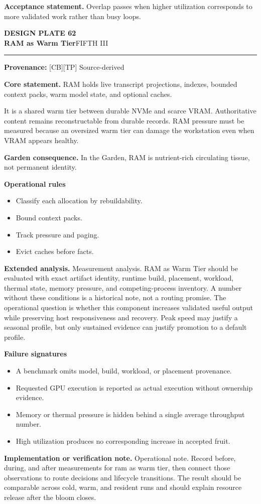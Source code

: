 \documentclass[10pt,letterpaper,oneside]{article}
\newcommand{\prov}[1]{\textcolor{gardenBlue}{\sffamily\footnotesize\textbf{Provenance:} #1}}
\newcommand{\platetitle}[3]{%
  \begin{minipage}[t][0.54in][t]{\textwidth}
  {\sffamily\bfseries\color{gardenDeep}\fontsize{9}{10}\selectfont DESIGN PLATE #1}\\[-1pt]
  {\sffamily\bfseries\color{gardenInk}\fontsize{16.5}{18}\selectfont #2}\hfill{\sffamily\color{gardenGreen}\large #3}
  \end{minipage}\vspace{-2pt}\hrule\vspace{5pt}}
\begin{document}
\begin{acceptbox}
\textbf{Acceptance statement.} Overlap passes when higher utilization corresponds to more validated work rather than busy loops.
\end{acceptbox}
\newpage
\platetitle{62}{RAM as Warm Tier}{FIFTH III}
\prov{[CB][TP] Source-derived}
\fontsize{8.85}{10.45}\selectfont
\begin{corebox}
\textbf{Core statement.} RAM holds live transcript projections, indexes, bounded context packs, warm model state, and optional caches.
\end{corebox}
It is a shared warm tier between durable NVMe and scarce VRAM. Authoritative content remains reconstructable from durable records. RAM pressure must be measured because an oversized warm tier can damage the workstation even when VRAM appears healthy.

\textbf{Garden consequence.} In the Garden, RAM is nutrient-rich circulating tissue, not permanent identity.

\textbf{Operational rules}
\begin{itemize}
\item Classify each allocation by rebuildability.
\item Bound context packs.
\item Track pressure and paging.
\item Evict caches before facts.
\end{itemize}
\textbf{Extended analysis.} Measurement analysis. RAM as Warm Tier should be evaluated with exact artifact identity, runtime build, placement, workload, thermal state, memory pressure, and competing-process inventory. A number without these conditions is a historical note, not a routing promise. The operational question is whether this component increases validated useful output while preserving host responsiveness and recovery. Peak speed may justify a seasonal profile, but only sustained evidence can justify promotion to a default profile.

\textbf{Failure signatures}
\begin{itemize}
\item A benchmark omits model, build, workload, or placement provenance.
\item Requested GPU execution is reported as actual execution without ownership evidence.
\item Memory or thermal pressure is hidden behind a single average throughput number.
\item High utilization produces no corresponding increase in accepted fruit.
\end{itemize}
\textbf{Implementation or verification note.} Operational note. Record before, during, and after measurements for ram as warm tier, then connect those observations to route decisions and lifecycle transitions. The result should be comparable across cold, warm, and resident runs and should explain resource release after the bloom closes.
\end{document}
